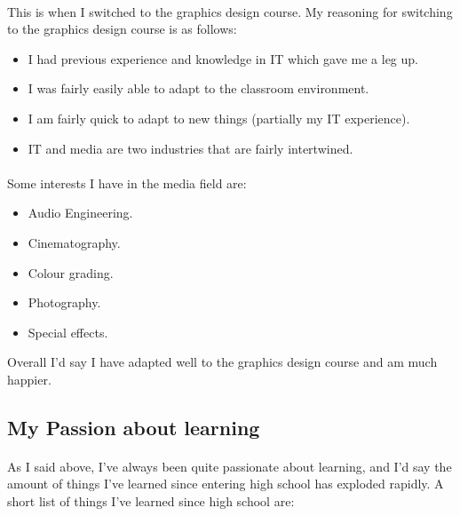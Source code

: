 \paragraph{}
This is when I switched to the graphics design course. My reasoning for
switching to the graphics design course is as follows:

\begin{itemize}
	\item {I had previous experience and knowledge in IT which gave me a leg up.}
	\item {I was fairly easily able to adapt to the classroom environment.}
	\item {I am fairly quick to adapt to new things (partially my IT experience).}
	\item {IT and media are two industries that are fairly intertwined.}
\end{itemize}

\paragraph{}

Some interests I have in the media field are:

\begin{itemize}
	\item {Audio Engineering.}
	\item {Cinematography.}
	\item {Colour grading.}
	\item {Photography.}
	\item {Special effects.}
\end{itemize}

Overall I'd say I have adapted well to the graphics design course and am much happier.

\subsection{My Passion about learning}

\paragraph{}
As I said above, I've always been quite passionate about learning, and I'd say
the amount of things I've learned since entering high school has exploded
rapidly. A short list of things I've learned since high school are:

